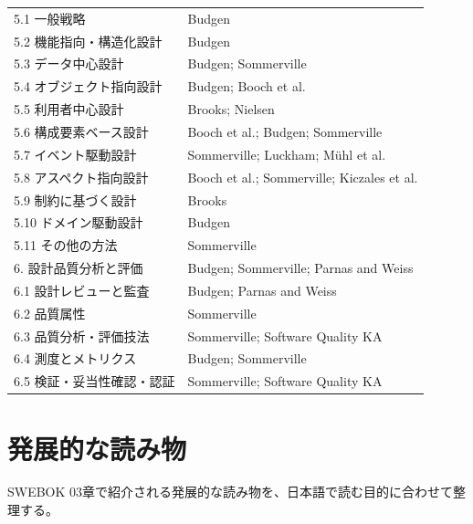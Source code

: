 \documentclass[10.5pt,a4paper]{ltjsarticle}
\begin{document}
\begin{longtable}{L{66mm}L{98mm}}
5.1 一般戦略 & Budgen \\
5.2 機能指向・構造化設計 & Budgen \\
5.3 データ中心設計 & Budgen; Sommerville \\
5.4 オブジェクト指向設計 & Budgen; Booch et al. \\
5.5 利用者中心設計 & Brooks; Nielsen \\
5.6 構成要素ベース設計 & Booch et al.; Budgen; Sommerville \\
5.7 イベント駆動設計 & Sommerville; Luckham; Mühl et al. \\
5.8 アスペクト指向設計 & Booch et al.; Sommerville; Kiczales et al. \\
5.9 制約に基づく設計 & Brooks \\
5.10 ドメイン駆動設計 & Budgen \\
5.11 その他の方法 & Sommerville \\
6. 設計品質分析と評価 & Budgen; Sommerville; Parnas and Weiss \\
6.1 設計レビューと監査 & Budgen; Parnas and Weiss \\
6.2 品質属性 & Sommerville \\
6.3 品質分析・評価技法 & Sommerville; Software Quality KA \\
6.4 測度とメトリクス & Budgen; Sommerville \\
6.5 検証・妥当性確認・認証 & Sommerville; Software Quality KA \\
\bottomrule
\end{longtable}

\section{発展的な読み物}

SWEBOK 03章で紹介される発展的な読み物を、日本語で読む目的に合わせて整理する。
\end{document}
